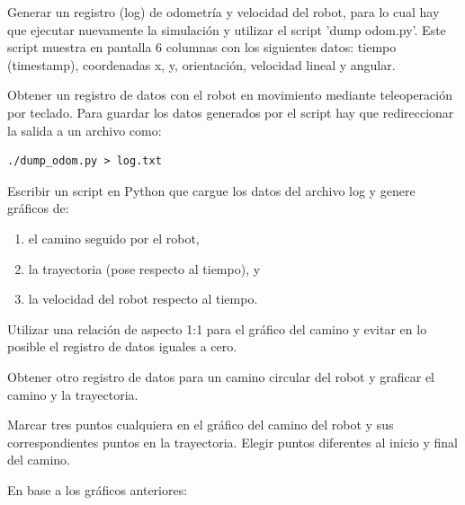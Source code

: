 \documentclass[tp]{lcc}
\begin{document}
	\ejercicio Generar un registro (log) de odometría y velocidad del robot, para lo cual hay que ejecutar nuevamente
	la simulación y utilizar el script ’dump odom.py’. Este script muestra en pantalla 6 columnas con los siguientes datos: tiempo (timestamp), coordenadas x, y, orientación, velocidad lineal y angular.
	
	\ejercicio Obtener un registro de datos con el robot en movimiento mediante teleoperación por teclado. Para guardar los datos generados por el script hay que redireccionar la salida a un archivo como:
	
	\begin{lstlisting}[style=bash] 
		./dump_odom.py > log.txt
	\end{lstlisting}
	
	\ejercicio Escribir un script en Python que cargue los datos del archivo log y genere gráficos de:
	\begin{enumerate}
		\item el camino seguido por el robot,
		\item la trayectoria (pose respecto al tiempo), y
		\item la velocidad del robot respecto al tiempo.
	\end{enumerate} 
	
	\begin{nota}
		Utilizar una relación de aspecto 1:1 para el gráfico del camino y evitar en lo posible el registro de datos iguales a cero.
	\end{nota}
	
	\ejercicio Obtener otro registro de datos para un camino circular del robot y graficar el camino y la trayectoria.
	
	\ejercicio Marcar tres puntos cualquiera en el gráfico del camino del robot y sus correspondientes puntos en la trayectoria. Elegir puntos diferentes al inicio y final del camino.
	
	
	En base a los gráficos anteriores:
	
\end{document}
